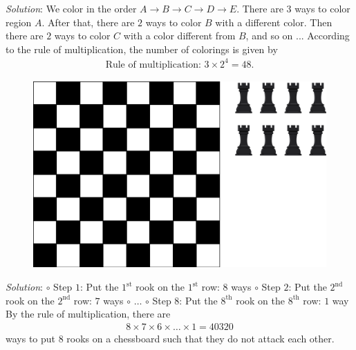 \begin{multicols}{2}
\begin{figure}[H]
		\vspace*{-10pt}
	\end{figure}
	\textit{Solution}: We color in the order $A \to B \to C \to D \to E$. There are $3$ ways to color region $A$. After that, there are $2$ ways to color $B$ with a different color. Then there are $2$ ways to color $C$ with a color different from $B$, and so on ...
	\vskip 0.1cm   
	According to the rule of multiplication, the number of colorings is given by
	\begin{align*}
		\text{Rule of multiplication: } 3 \times 2^4= 48.
	\end{align*}
	\begin{figure}[H]
		\centering
		\captionsetup{labelformat= empty, justification=centering}
		\includegraphics[width=1\linewidth]{co}
		\vspace*{-10pt}
	\end{figure}
	\textit{Solution}:
	\vskip 0.1cm 
	$\circ$ Step $1$: Put the $1^{\text{st}}$ rook on the $1^{\text{st}}$ row: $8$ ways
	\vskip 0.1cm
	$\circ$ Step $2$: Put the $2^{\text{nd}}$ rook on the $2^{\text{nd}}$ row: $7$ ways
	\vskip 0.1cm
	$\circ$ $\ldots$
	\vskip 0.1cm
	$\circ$ Step $8$: Put the $8^{\text{th}}$ rook on the $8^{\text{th}}$ row: $1$ way
	\vskip 0.1cm
	By the rule of multiplication, there are 
	\begin{align*}
		8\times7\times6\times\ldots\times1=40320
	\end{align*}
	ways to put $8$ rooks on a chessboard such that they do not attack each other.

\end{multicols}
